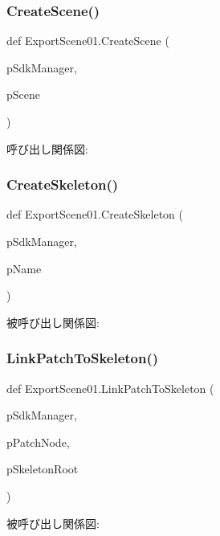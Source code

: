 \subsubsection{\texorpdfstring{Create\+Scene()}{CreateScene()}}
{\footnotesize\ttfamily def Export\+Scene01.\+Create\+Scene (\begin{DoxyParamCaption}\item[{}]{p\+Sdk\+Manager,  }\item[{}]{p\+Scene }\end{DoxyParamCaption})}

呼び出し関係図\+:
\mbox{\label{namespace_export_scene01_a5259fc3c896eb260506c25926f104b52}} 
\subsubsection{\texorpdfstring{Create\+Skeleton()}{CreateSkeleton()}}
{\footnotesize\ttfamily def Export\+Scene01.\+Create\+Skeleton (\begin{DoxyParamCaption}\item[{}]{p\+Sdk\+Manager,  }\item[{}]{p\+Name }\end{DoxyParamCaption})}

被呼び出し関係図\+:
\mbox{\label{namespace_export_scene01_a12065724eab3b0af37e5ac87cfa97c0a}} 
\subsubsection{\texorpdfstring{Link\+Patch\+To\+Skeleton()}{LinkPatchToSkeleton()}}
{\footnotesize\ttfamily def Export\+Scene01.\+Link\+Patch\+To\+Skeleton (\begin{DoxyParamCaption}\item[{}]{p\+Sdk\+Manager,  }\item[{}]{p\+Patch\+Node,  }\item[{}]{p\+Skeleton\+Root }\end{DoxyParamCaption})}

被呼び出し関係図\+:
\mbox{\label{namespace_export_scene01_a7d99da67d243a6fd5092f8a00f751cc8}} 
